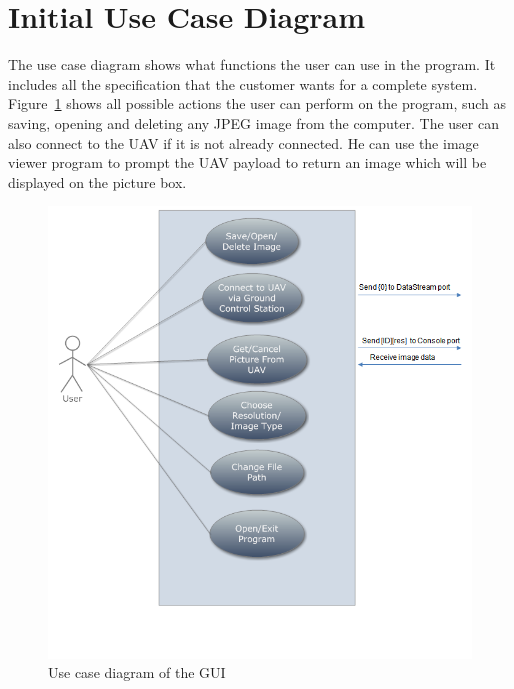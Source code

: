 \section{Initial Use Case Diagram}
The use case diagram shows what functions the user can use in the program.
It includes all the specification that the customer wants for a complete system.
Figure~\ref{GUI_useCase} shows all possible actions the user can perform on the program, such as saving, opening and deleting any JPEG image from the computer. 
The user can also connect to the UAV if it is not already connected.
He can use the image viewer program to prompt the UAV payload to return an image which will be displayed on the picture box.
\begin{figure}[H]
\begin{center}
\includegraphics[scale=0.6]{figures/userCase.png} 
\end{center}
\caption{Use case diagram of the GUI\label{GUI_useCase}}
\end{figure}

